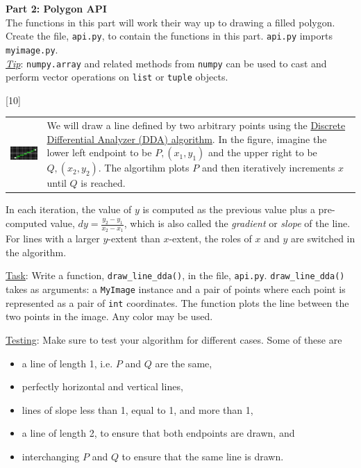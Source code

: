 \documentclass[addpoints]{exam}
\begin{document}
\begin{questions}
  \begin{EnvFullwidth}
    {\Large\bf Part 2: Polygon API}\\

    The functions in this part will work their way up to drawing a filled polygon.\\ Create the file, \texttt{api.py}, to contain the functions in this part. \texttt{api.py} imports \texttt{myimage.py}.\\\underline{\textit{Tip}}: \texttt{numpy.array} and related methods from \texttt{numpy} can be used to cast and perform vector operations on \texttt{list} or \texttt{tuple} objects.
  \end{EnvFullwidth}

[10]

  \noindent
  \begin{tabularx}{\linewidth}{lX}
    \includegraphics[align=t]{dda} &
                                     We will draw a line defined by two arbitrary points using the \href{https://en.wikipedia.org/wiki/Digital_differential_analyzer_(graphics_algorithm)}{Discrete Differential Analyzer (DDA) algorithm}. In the figure, imagine the lower left endpoint to be $P, (x_1,y_1)$ and the upper right to be $Q, (x_2,y_2)$. The algortihm plots $P$ and then iteratively increments $x$ until $Q$ is reached.
  \end{tabularx}
  In each iteration, the value of $y$ is computed as the previous value plus a pre-computed value, $dy = \frac{y_2-y_1}{x_2-x_1}$, which is also called the \textit{gradient} or \textit{slope} of the line. For lines with a larger $y$-extent than $x$-extent, the roles of $x$ and $y$ are switched in the algorithm.
  
  \underline{Task}: Write a function, \texttt{draw\_line\_dda()}, in the file, \texttt{api.py}. \texttt{draw\_line\_dda()} takes as arguments: a \texttt{MyImage} instance and a pair of points where each point is represented as a pair of \texttt{int} coordinates. The function plots the line between the two points in the image. Any color may be used.

  \underline{Testing}: Make sure to test your algorithm for different cases. Some of these are
  \begin{itemize}
  \item a line of length 1, i.e. $P$ and $Q$ are the same,
  \item perfectly horizontal and vertical lines,
  \item lines of slope less than 1, equal to 1, and more than 1,
  \item a line of length 2, to ensure that both endpoints are drawn, and
  \item interchanging $P$ and $Q$ to ensure that the same line is drawn.
  \end{itemize}


\end{questions}
\end{document}
